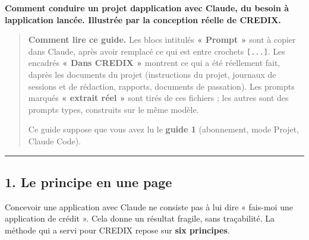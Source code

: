 \documentclass[
  french,
  11pt,
  a4paper,
]{article}
\begin{document}
\textbf{Comment conduire un projet d\textquotesingle application avec
Claude, du besoin à l\textquotesingle application lancée. Illustrée par
la conception réelle de CREDIX.}

\begin{quote}
\textbf{Comment lire ce guide.} Les blocs intitulés \textbf{« Prompt »}
sont à copier dans Claude, après avoir remplacé ce qui est entre
crochets \texttt{{[}...{]}}. Les encadrés \textbf{« Dans CREDIX »}
montrent ce qui a été réellement fait, d\textquotesingle après les
documents du projet (instructions du projet, journaux de sessions et de
rédaction, rapports, documents de passation). Les prompts marqués
\textbf{« extrait réel »} sont tirés de ces fichiers ; les autres sont
des prompts types, construits sur le même modèle.

Ce guide suppose que vous avez lu le \textbf{guide 1} (abonnement, mode
Projet, Claude Code).
\end{quote}

\begin{center}\rule{0.5\linewidth}{0.5pt}\end{center}

\subsection{1. Le principe en une page}\label{1-le-principe-en-une-page}

Concevoir une application avec Claude ne consiste pas à lui dire «
fais-moi une application de crédit ». Cela donne un résultat fragile,
sans traçabilité. La méthode qui a servi pour CREDIX repose sur
\textbf{six principes}.
\end{document}
